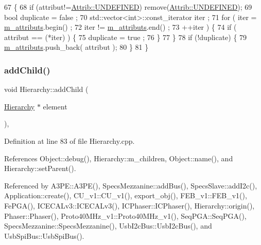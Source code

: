 \begin{DoxyCode}
67                             \{
68     \textcolor{keywordflow}{if} (attribut!=\hyperlink{classAttrib_a69e171d7cc6417835a5a306d3c764235a3a8da2ab97dda18aebab196fe4100531}{Attrib::UNDEFINED}) \textcolor{keyword}{remove}(\hyperlink{classAttrib_a69e171d7cc6417835a5a306d3c764235a3a8da2ab97dda18aebab196fe4100531}{Attrib::UNDEFINED});
69     \textcolor{keywordtype}{bool} duplicate = false ;
70     std::vector<int>::const\_iterator iter ;
71     \textcolor{keywordflow}{for} ( iter  = \hyperlink{classAttrib_ac4bd58a0cc6b38a3b711d609a3d3aacc}{m\_attributs}.begin() ;
72           iter != \hyperlink{classAttrib_ac4bd58a0cc6b38a3b711d609a3d3aacc}{m\_attributs}.end()   ;
73           ++iter ) \{
74       \textcolor{keywordflow}{if} ( attribut == (*iter) ) \{
75         duplicate = true ;
76       \}
77     \}
78     \textcolor{keywordflow}{if} (!duplicate) \{
79       \hyperlink{classAttrib_ac4bd58a0cc6b38a3b711d609a3d3aacc}{m\_attributs}.push\_back( attribut );
80     \}
81   \}
\end{DoxyCode}
\mbox{\label{classHierarchy_ad677774ff38fcb257c04a3a10d471fac}} 
\subsubsection{\texorpdfstring{add\+Child()}{addChild()}}
{\footnotesize\ttfamily void Hierarchy\+::add\+Child (\begin{DoxyParamCaption}\item[{\hyperlink{classHierarchy}{Hierarchy} $\ast$}]{element }\end{DoxyParamCaption})\hspace{0.3cm}{\ttfamily [virtual]}, {\ttfamily [inherited]}}



Definition at line 83 of file Hierarchy.\+cpp.



References Object\+::debug(), Hierarchy\+::m\+\_\+children, Object\+::name(), and Hierarchy\+::set\+Parent().



Referenced by A3\+P\+E\+::\+A3\+P\+E(), Specs\+Mezzanine\+::add\+Bus(), Specs\+Slave\+::add\+I2c(), Application\+::create(), C\+U\+\_\+v1\+::\+C\+U\+\_\+v1(), export\+\_\+obj(), F\+E\+B\+\_\+v1\+::\+F\+E\+B\+\_\+v1(), Fe\+P\+G\+A(), I\+C\+E\+C\+A\+Lv3\+::\+I\+C\+E\+C\+A\+Lv3(), I\+C\+Phaser\+::\+I\+C\+Phaser(), Hierarchy\+::origin(), Phaser\+::\+Phaser(), Proto40\+M\+Hz\+\_\+v1\+::\+Proto40\+M\+Hz\+\_\+v1(), Seq\+P\+G\+A\+::\+Seq\+P\+G\+A(), Specs\+Mezzanine\+::\+Specs\+Mezzanine(), Usb\+I2c\+Bus\+::\+Usb\+I2c\+Bus(), and Usb\+Spi\+Bus\+::\+Usb\+Spi\+Bus().


